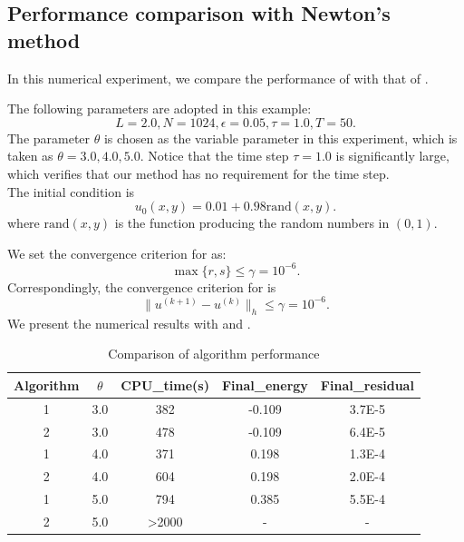 \subsection{Performance comparison with Newton's method}
\label{subsec:comparison}
In this numerical experiment, we compare the performance of  with that of . 
\par The following parameters are adopted in this example:
\begin{equation}
L=2.0, N=1024,\epsilon=0.05, \tau=1.0, T=50.
\end{equation}
The parameter $\theta$ is chosen as the variable parameter in this experiment, which is taken as $\theta=3.0,4.0,5.0$. 
Notice that the time step $\tau=1.0$ is significantly large, 
which verifies that our method has no requirement for the time step. \\
The initial condition is
\begin{equation}
    u_0(x,y)=0.01+0.98\text{rand}(x,y).
\end{equation}
where $\text{rand}(x, y)$ is the function producing the random numbers in $(0,1)$. 
\par We set the convergence criterion for  as:
\begin{equation}
\max\{r,s\}\leq \gamma=10^{-6}.
\end{equation}
Correspondingly, the convergence criterion for  is
\begin{equation}
\|u^{(k+1)}-u^{(k)}\|_h \leq \gamma=10^{-6}.
\end{equation}
We present the numerical results with  and .
\begin{table}
    \centering
    \begin{tabular}{c|c|c|c|c}
    Algorithm&$\theta$&CPU\_time(s)&Final\_energy&Final\_residual\\
    \hline
    1&3.0&382&-0.109&3.7E-5\\
    \hline
    2&3.0&478&-0.109&6.4E-5\\  
    \hline
    1&4.0&371&0.198&1.3E-4\\
    \hline
    2&4.0&604&0.198&2.0E-4\\
    \hline
    1&5.0&794&0.385&5.5E-4\\
    \hline
    2&5.0&>2000&-&-\\

    \end{tabular}
    \caption{Comparison of algorithm performance}
    \label{ta:comparison}
\end{table}


